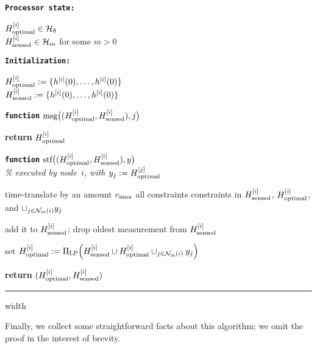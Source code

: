 \documentclass[onecolumn,journal,letterpaper]{IEEEtran}
\newcommand{\subscr}[2]{{#1}_{\textup{#2}}}
\newcommand{\union}{\cup}
\newcommand{\vmax}{\subscr{v}{max}}
\newcommand{\Hoptimal}[1]{H^{[#1]}_{\textup{optimal}}}
\newcommand{\Hmeasured}[1]{H^{[#1]}_{\textup{measured}}}
\renewcommand{\Hmeasured}[1]{H^{[#1]}_{\textup{sensed}}}
\newcommand{\HH}{\mathcal{H}}
\newcommand{\innbrs}{\subscr{\mathcal{N}}{in}}
\newcommand{\supind}[2]{{#1}^{[#2]}}
\newcommand{\msg}{\textup{msg}}
\newcommand{\stf}{\textup{stf}}
\newcommand{\PiLP}{\Pi_{\textup{LP}}}
\begin{document}
\noindent\begin{minipage}{0.44\linewidth}\textbf{\texttt{Processor state:}}\end{minipage}\begin{minipage}[t]{0.56\linewidth}
  $\Hoptimal{i} \in \HH_8$\\
  $\Hmeasured{i} \in \HH_m$ for some $m>0$
\end{minipage}
\vspace{.05em}

\noindent\begin{minipage}{0.44\linewidth}\textbf{\texttt{Initialization:}}\end{minipage}\begin{minipage}[t]{0.56\linewidth}
  $\Hoptimal{i} := \{\supind{h}{i}(0),\dots,\supind{h}{i}(0)\}$\\
  $\Hmeasured{i} := \{\supind{h}{i}(0),\dots,\supind{h}{i}(0)\}$\end{minipage}

\bigskip

\noindent\textbf{\texttt{function}} $\msg\big( (\Hoptimal{i},
\Hmeasured{i}), j\big)$
\begin{algorithmic}[1]
  \STATE \textbf{return} $\Hoptimal{i}$
\end{algorithmic}

\medskip

\noindent\textbf{\texttt{function}}  $\stf\big((\Hoptimal{i}, \Hmeasured{i}), y\big)$ \\
\emph{\% executed by node~$i$, with $y_j := \Hoptimal{j}$}\\[-1.9em]
\begin{algorithmic}[1]

  \STATE time-translate by an amount $\vmax$  all constraints
  constraints in     $\Hmeasured{i}$, $\Hoptimal{i}$, and
  $\union_{j\in \innbrs(i)} y_j$

  \STATE add it to $\Hmeasured{i}$; drop oldest
  measurement from $\Hmeasured{i}$
  \ENDIF

  \STATE set $\Hoptimal{i} := \PiLP \Big( \Hmeasured{i} \union
  \Hoptimal{i} \union_{j\in \innbrs(i)} y_j \Big)$

  \STATE \textbf{return} $(\Hoptimal{i},\Hmeasured{i})$
\end{algorithmic}

\smallskip \hrule width \linewidth \medskip

Finally, we collect some straightforward facts about this algorithm; we
omit the proof in the interest of brevity.
\end{document}
